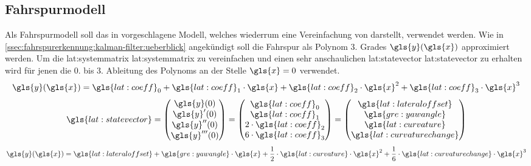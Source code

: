 \subsection{Fahrspurmodell}
Als Fahrspurmodell soll das in \autocite{petersfalkoFPGAbasierteBildverarbeitungspipelineZur2009} vorgeschlagene Modell, welches wiederrum eine Vereinfachung von \autocite{risackRobustLaneRecognition} darstellt, verwendet werden.
Wie in \ref{ssec:fahrspurerkennung:kalman-filter:ueberblick} angekündigt soll die Fahrspur als Polynom 3. Grades \begin{math} \gls{y}(\gls{x}) \end{math} approximiert werden. Um die \glsdesc{lat:systemmatrix} \gls{lat:systemmatrix} zu vereinfachen und einen sehr anschaulichen \glsdesc{lat:statevector} \gls{lat:statevector} zu erhalten wird für jenen die 0. bis 3. Ableitung des Polynoms an der Stelle \begin{math} \gls{x}=0 \end{math} verwendet. 
\begin{equation}
\label{eq:polylane}
\gls{y}(\gls{x}) =
\gls{lat:coeff}_0 +
\gls{lat:coeff}_1 \cdot \gls{x} +
\gls{lat:coeff}_2 \cdot \gls{x}^2 +
\gls{lat:coeff}_3 \cdot \gls{x}^3
\end{equation}
\begin{equation}
\label{eq:statevectorlane}
\gls{lat:statevector} = 
\begin{pmatrix}
\gls{y}(0) \\
\gls{y}^\prime(0) \\
\gls{y}^{\prime\prime}(0) \\
\gls{y}^{\prime\prime\prime}(0) \\
\end{pmatrix}
=
\begin{pmatrix}
\gls{lat:coeff}_0 \\
\gls{lat:coeff}_1 \\
2 \cdot \gls{lat:coeff}_2 \\
6 \cdot \gls{lat:coeff}_3 \\
\end{pmatrix}
=
\begin{pmatrix}
\gls{lat:lateraloffset} \\
\gls{gre:yawangle} \\
\gls{lat:curvature} \\
\gls{lat:curvaturechange} \\
\end{pmatrix}
\end{equation}
\begin{equation}
\label{eq:polylanestate}
\gls{y}(\gls{x}) =
\gls{lat:lateraloffset} +
\gls{gre:yawangle} \cdot \gls{x} +
\frac{1}{2} \cdot \gls{lat:curvature} \cdot \gls{x}^2 +
\frac{1}{6} \cdot \gls{lat:curvaturechange} \cdot \gls{x}^3
\end{equation}
 
